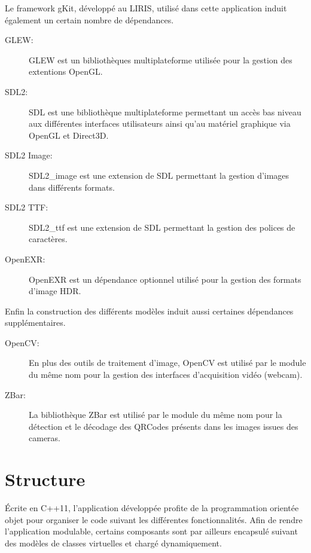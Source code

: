 \documentclass[10pt,a4paper,twoside, twocolumn]{report}
\begin{document}
Le framework gKit, développé au LIRIS, utilisé dans cette application induit également un certain nombre de dépendances.

\begin{description}
	\item[GLEW:] GLEW est un bibliothèques multiplateforme utilisée pour la gestion des extentions OpenGL.
	\item[SDL2:] SDL est une bibliothèque multiplateforme permettant un accès bas niveau aux différentes interfaces utilisateurs ainsi qu’au matériel graphique via OpenGL et Direct3D.
	\item[SDL2 Image:] SDL2\_image est une extension de SDL permettant la gestion d’images dans différents formats.
	\item[SDL2 TTF:] SDL2\_ttf est une extension de SDL permettant la gestion des polices de caractères.
	\item[OpenEXR:] OpenEXR est un dépendance optionnel utilisé pour la gestion des formats d’image HDR.
\end{description}

Enfin la construction des différents modèles induit aussi certaines dépendances supplémentaires.

\begin{description}
	\item[OpenCV:] En plus des outils de traitement d’image, OpenCV est utilisé par le module du même nom pour la gestion des interfaces d’acquisition vidéo (webcam).
	\item[ZBar:] La bibliothèque ZBar est utilisé par le module du même nom pour la détection et le décodage des QRCodes présents dans les images issues des cameras.
\end{description}
 




\section{Structure}

Écrite en C++11, l’application développée profite de la programmation orientée objet pour organiser le code suivant les différentes fonctionnalités. Afin de rendre l’application modulable, certains composants sont par ailleurs encapsulé suivant des modèles de classes virtuelles et chargé dynamiquement.
\end{document}
